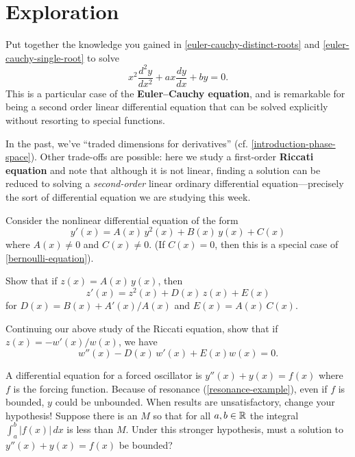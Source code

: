 \documentclass{homework}
\begin{document}
\section{Exploration}

\begin{problem}\label{second-order-euler-cauchy}Put together the knowledge you gained in \ref{euler-cauchy-distinct-roots} and \ref{euler-cauchy-single-root} to solve
  \[
    x^{2}{\frac {d^{2}y}{dx^{2}}}+ax{\frac {dy}{dx}}+by=0.
  \]
  This is a particular case of the \textbf{Euler--Cauchy equation},
  and is remarkable for being a second order linear differential
  equation that can be solved explicitly without resorting to special
  functions.
\end{problem}

\begin{problem}\label{riccati-equation}In the past, we've ``traded dimensions for derivatives'' (cf. \ref{introduction-phase-space}).  Other trade-offs are
  possible: here we study a first-order \textbf{Riccati equation} and
  note that although it is not linear, finding a solution can be
  reduced to solving a \textit{second-order} linear ordinary
  differential equation---precisely the sort of differential equation
  we are studying this week.

  Consider the nonlinear differential equation of the form
  \[
    y'(x)=A(x)\,y^{2}(x) + B(x)\,y(x) + C(x)
  \]
  where $A(x) \neq 0$ and $C(x) \neq 0$.  (If $C(x) = 0$, then this is
  a special case of \ref{bernoulli-equation}).

  Show that if $z(x) = A(x) \, y(x)$, then
  \[
    z'(x)=z^{2}(x) + D(x)\,z(x) + E(x)
  \]
  for $D(x) = B(x) + A'(x)/A(x)$ and $E(x) = A(x) \, C(x)$.
\end{problem}
  
\begin{problem}\label{more-ricatti}Continuing our above study of the Riccati equation,
  show that if $z(x) = -w'(x)/w(x)$, we have
  \[
    w''(x) - D(x) \, w'(x) + E(x) w(x) = 0.
  \]
\end{problem}

\begin{problem}
  A differential equation for a forced oscillator is
  $y''(x) + y(x) = f(x)$ where $f$ is the forcing function.  Because
  of resonance (\ref{resonance-example}), even if $f$ is bounded, $y$
  could be unbounded.  When results are unsatisfactory, change your
  hypothesis!  Suppose there is an $M$ so that for all $a, b \in \mathbb{R}$
  the integral $\int_a^b \left|f(x)\right| \, dx$ is less than $M$.
  Under this stronger hypothesis, must a solution to
  $y''(x) + y(x) = f(x)$ be bounded?
\end{problem}
\end{document}

